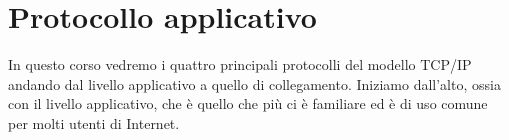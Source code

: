 \chapter{Protocollo applicativo}
In questo corso vedremo i quattro principali protocolli del modello TCP/IP andando dal livello 
applicativo a quello di collegamento. Iniziamo dall'alto, ossia con il livello applicativo, che 
è quello che più ci è familiare ed è di uso comune per molti utenti di Internet.


